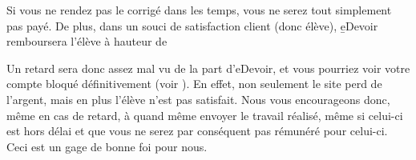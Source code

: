 ﻿Si vous ne rendez pas le corrigé dans les temps, vous ne serez tout simplement pas payé. De plus, dans un souci de satisfaction client (donc élève), \b{eDevoir} remboursera l'élève à hauteur de %

Un retard sera donc assez mal vu de la part d'eDevoir, et vous pourriez voir votre compte bloqué définitivement (voir ). En effet, non seulement le site perd de l'argent, mais en plus l'élève n'est pas satisfait. Nous vous encourageons donc, même en cas de retard, à quand même envoyer le travail réalisé, même si celui-ci est hors délai et que vous ne serez par conséquent pas rémunéré pour celui-ci. Ceci est un gage de bonne foi pour nous.